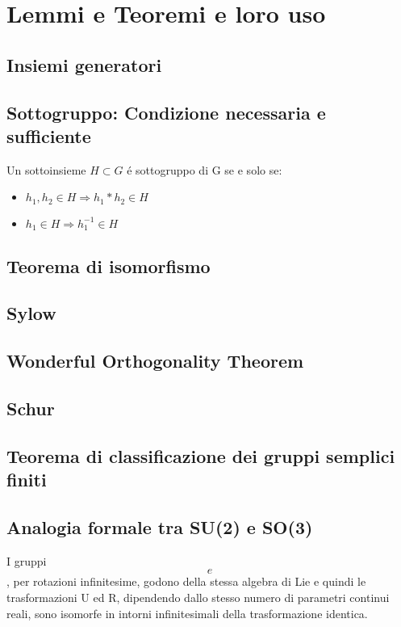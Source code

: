 \documentclass[oneside,12pt]{memoir}
\begin{document}
\chapter{Lemmi e Teoremi e loro uso}
\PartialToc

\section{Insiemi generatori}

\section{Sottogruppo: Condizione necessaria e sufficiente}
Un sottoinsieme $H\subset G$ \'e sottogruppo di G se e solo se:
\begin{itemize}
\item $ h_1,h_2\in H \Rightarrow h_1*h_2\in H $
\item $h_1\in H \Rightarrow h_1^{-1}\in H$
\end{itemize}





\section{Teorema di isomorfismo}


\section{Sylow}

\section{Wonderful Orthogonality Theorem}

\section{Schur}

\section{Teorema di classificazione dei gruppi semplici finiti}

\section{Analogia formale tra SU(2) e SO(3)}
I gruppi $$ e $$, per rotazioni infinitesime, godono della stessa algebra di Lie e quindi le trasformazioni U ed R, dipendendo dallo stesso numero di parametri continui reali, sono isomorfe in intorni infinitesimali della trasformazione identica. 
\end{document}
